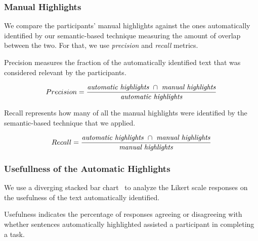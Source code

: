 {%


\subsubsection{Manual Highlights}


We compare the participants' manual highlights  against the ones automatically identified by our semantic-based technique measuring the amount of overlap between the two. 
For that, we use \textit{precision} and \textit{recall} metrics. 




Precision measures the fraction of the automatically identified text that was  considered relevant
by the participants.

\smallskip
\begin{small}


\begin{equation}
    Precision = \frac{
        \text{\textit{automatic highlights}~} \cap 
        \text{~\textit{manual highlights}}
    }{\text{\textit{automatic highlights}}}
\end{equation}
\end{small}


Recall represents how many of all the manual highlights were identified by the semantic-based technique that we applied.

\smallskip
\begin{small}

\begin{equation}
    Recall = \frac{
        \text{\textit{automatic highlights}~} \cap 
        \text{~\textit{manual highlights}}
    }{\text{\textit{manual highlights}}}
\end{equation}
\end{small}

\medskip
{}




\subsubsection{Usefullness of the Automatic Highlights}


We use a diverging stacked bar chart~\cite{Heiberger2014} to analyze the  Likert scale
responses on the usefulness of the text automatically identified.


Usefulness indicates the percentage of responses agreeing or disagreeing with whether sentences
automatically highlighted assisted a participant in completing a task.


}
